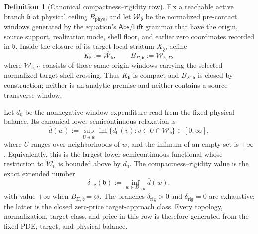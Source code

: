 \documentclass[11pt]{article}
\numberwithin{section}{part}
\theoremstyle{plain}
\theoremstyle{definition}
\newtheorem{definition}[definition]{Definition}
\theoremstyle{remark}
\newcommand{\Abs}{\mathsf{Abs}}
\newcommand{\Lift}{\mathsf{Lift}}
\newcommand{\Phys}{\mathrm{phys}}
\newcommand{\Budget}{B_{\Phys}}
\begin{document}
\begin{definition}[Canonical compactness--rigidity row]
\label{def:typed-compactness-invariant}
Fix a reachable active branch \(\mathfrak b\) at physical ceiling
\(\Budget\), and let \(\mathcal W_{\mathfrak b}\) be the normalized
pre-contact windows generated by the equation's \(\Abs/\Lift\) grammar that
have the origin, source support, realization mode, shell floor, and earlier
zero coordinates recorded in \(\mathfrak b\).  Inside the closure of its
target-local stratum \(X_{\mathfrak b}\), define
\begin{equation}
 \label{eq:canonical-window-closures}
 K_{\mathfrak b}:=\overline{\mathcal W_{\mathfrak b}},
 \qquad
 B_{\Sigma,\mathfrak b}:=\overline{\mathcal W_{\mathfrak b,\Sigma}},
\end{equation}
where \(\mathcal W_{\mathfrak b,\Sigma}\) consists of those same-origin
windows carrying the selected normalized target-shell crossing.  Thus
\(K_{\mathfrak b}\) is compact and \(B_{\Sigma,\mathfrak b}\) is closed by
construction; neither is an analytic premise and neither contains a
source-transverse window.

Let \(d_0\) be the nonnegative window expenditure read from the fixed
physical balance.  Its canonical lower-semicontinuous relaxation is
\begin{equation}
 \label{eq:canonical-lsc-price}
 \overline d(w):=\sup_{U\ni w}
  \inf\{d_0(v):v\in U\cap\mathcal W_{\mathfrak b}\}
 \in[0,\infty],
\end{equation}
where \(U\) ranges over neighborhoods of \(w\), and the infimum of an empty
set is \(+\infty\).  Equivalently, this is the largest lower-semicontinuous
functional whose restriction to \(\mathcal W_{\mathfrak b}\) is bounded above by
\(d_0\).
The compactness--rigidity value is the exact extended number
\begin{equation}
 \label{eq:compactness-rigidity-gap}
 \delta_{\mathrm{rig}}(\mathfrak b)
 :=\inf_{w\in B_{\Sigma,\mathfrak b}}\overline d(w),
\end{equation}
with value \(+\infty\) when \(B_{\Sigma,\mathfrak b}=\varnothing\).  The branches
\(\delta_{\mathrm{rig}}>0\) and \(\delta_{\mathrm{rig}}=0\) are exhaustive;
the latter is the closed zero-price target-approach class.  Every topology,
normalization, target class, and price in this row is therefore generated
from the fixed PDE, target, and physical balance.
\end{definition}
\end{document}
